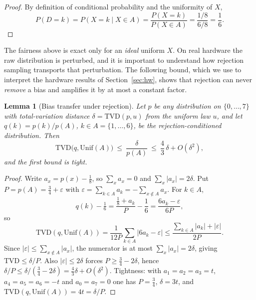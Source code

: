 \documentclass[journal]{IEEEtran}
\newtheorem{lemma}{Lemma}
\begin{document}
\begin{proof}
By definition of conditional probability and the uniformity of $X$,
\begin{equation}
P(D=k) = P(X=k\mid X\in A) = \frac{P(X=k)}{P(X\in A)} = \frac{1/8}{6/8} = \frac{1}{6}.
\end{equation}
\end{proof}

The fairness above is exact only for an \emph{ideal} uniform $X$. On real hardware the raw distribution is perturbed, and it is important to understand how rejection sampling transports that perturbation. The following bound, which we use to interpret the hardware results of Section~\ref{sec:hw}, shows that rejection can never \emph{remove} a bias and amplifies it by at most a constant factor.

\begin{lemma}[Bias transfer under rejection]\label{lem:transfer}
Let $p$ be any distribution on $\{0,\dots,7\}$ with total-variation distance $\delta=\mathrm{TVD}(p,u)$ from the uniform law $u$, and let $q(k)=p(k)/p(A)$, $k\in A=\{1,\dots,6\}$, be the rejection-conditioned distribution. Then
\begin{equation}
\mathrm{TVD}\bigl(q,\mathrm{Unif}(A)\bigr)\ \le\ \frac{\delta}{p(A)}\ \le\ \frac{4}{3}\,\delta+O(\delta^2),
\end{equation}
and the first bound is tight.
\end{lemma}

\begin{proof}
Write $a_x=p(x)-\tfrac18$, so $\sum_x a_x=0$ and $\sum_x|a_x|=2\delta$. Put $P=p(A)=\tfrac34+\varepsilon$ with $\varepsilon=\sum_{k\in A}a_k=-\sum_{x\notin A}a_x$. For $k\in A$,
\begin{equation}
q(k)-\tfrac16=\frac{\tfrac18+a_k}{P}-\frac16=\frac{6a_k-\varepsilon}{6P},
\end{equation}
so
\begin{equation}
\mathrm{TVD}(q,\mathrm{Unif}(A))=\frac{1}{12P}\sum_{k\in A}\lvert 6a_k-\varepsilon\rvert\le\frac{\sum_{k\in A}|a_k|+|\varepsilon|}{2P}.
\end{equation}
Since $|\varepsilon|\le\sum_{x\notin A}|a_x|$, the numerator is at most $\sum_x|a_x|=2\delta$, giving $\mathrm{TVD}\le\delta/P$. Also $|\varepsilon|\le 2\delta$ forces $P\ge\tfrac34-2\delta$, hence $\delta/P\le\delta/(\tfrac34-2\delta)=\tfrac43\delta+O(\delta^2)$. Tightness: with $a_1=a_2=a_3=t$, $a_4=a_5=a_6=-t$ and $a_0=a_7=0$ one has $P=\tfrac34$, $\delta=3t$, and $\mathrm{TVD}(q,\mathrm{Unif}(A))=4t=\delta/P$.
\end{proof}
\end{document}
